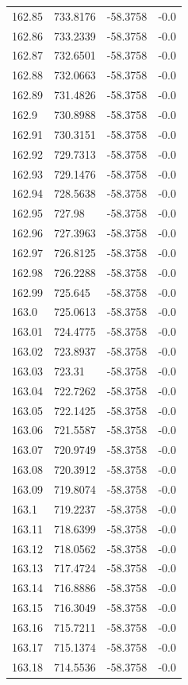 \begin{table}[H]
\begin{tabular}{llll}
162.85 & 733.8176 & -58.3758 & -0.0 \\
162.86 & 733.2339 & -58.3758 & -0.0 \\
162.87 & 732.6501 & -58.3758 & -0.0 \\
162.88 & 732.0663 & -58.3758 & -0.0 \\
162.89 & 731.4826 & -58.3758 & -0.0 \\
162.9 & 730.8988 & -58.3758 & -0.0 \\
162.91 & 730.3151 & -58.3758 & -0.0 \\
162.92 & 729.7313 & -58.3758 & -0.0 \\
162.93 & 729.1476 & -58.3758 & -0.0 \\
162.94 & 728.5638 & -58.3758 & -0.0 \\
162.95 & 727.98 & -58.3758 & -0.0 \\
162.96 & 727.3963 & -58.3758 & -0.0 \\
162.97 & 726.8125 & -58.3758 & -0.0 \\
162.98 & 726.2288 & -58.3758 & -0.0 \\
162.99 & 725.645 & -58.3758 & -0.0 \\
163.0 & 725.0613 & -58.3758 & -0.0 \\
163.01 & 724.4775 & -58.3758 & -0.0 \\
163.02 & 723.8937 & -58.3758 & -0.0 \\
163.03 & 723.31 & -58.3758 & -0.0 \\
163.04 & 722.7262 & -58.3758 & -0.0 \\
163.05 & 722.1425 & -58.3758 & -0.0 \\
163.06 & 721.5587 & -58.3758 & -0.0 \\
163.07 & 720.9749 & -58.3758 & -0.0 \\
163.08 & 720.3912 & -58.3758 & -0.0 \\
163.09 & 719.8074 & -58.3758 & -0.0 \\
163.1 & 719.2237 & -58.3758 & -0.0 \\
163.11 & 718.6399 & -58.3758 & -0.0 \\
163.12 & 718.0562 & -58.3758 & -0.0 \\
163.13 & 717.4724 & -58.3758 & -0.0 \\
163.14 & 716.8886 & -58.3758 & -0.0 \\
163.15 & 716.3049 & -58.3758 & -0.0 \\
163.16 & 715.7211 & -58.3758 & -0.0 \\
163.17 & 715.1374 & -58.3758 & -0.0 \\
163.18 & 714.5536 & -58.3758 & -0.0 \\

\end{tabular}
\end{table}
